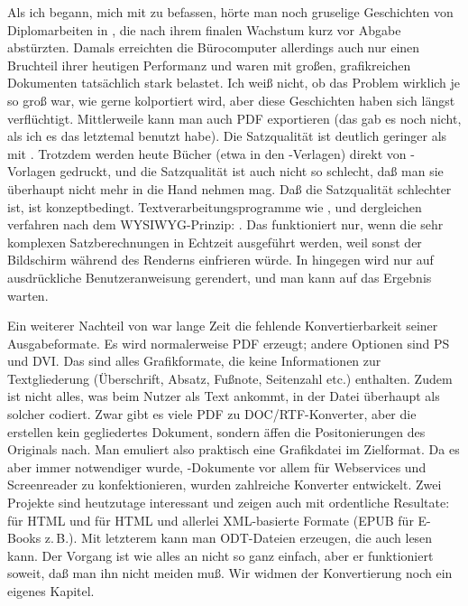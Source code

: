 \documentclass[
	11pt,        %
	table,       %
	twoside,     %
	notitlepage, %
]{scrreprt}
\begin{document}
Als ich begann, mich mit \LaTeXi{} zu befassen, hörte man noch gruselige Geschichten von Diplomarbeiten in , die nach ihrem finalen Wachstum kurz vor Abgabe abstürzten. Damals erreichten die Bürocomputer allerdings auch nur einen Bruchteil ihrer heutigen Performanz und waren mit großen, grafikreichen Dokumenten tatsächlich stark belastet. Ich weiß nicht, ob das Problem wirklich je so groß war, wie gerne kolportiert wird, aber diese Geschichten haben sich längst verflüchtigt. Mittlerweile kann man auch PDF exportieren (das gab es noch nicht, als ich es das letztemal benutzt habe). Die Satzqualität ist deutlich geringer als mit \LaTeXi. Trotzdem werden heute Bücher (etwa in den -Verlagen) direkt von -Vorlagen gedruckt, und die Satzqualität ist auch nicht so schlecht, daß man sie überhaupt nicht mehr in die Hand nehmen mag. Daß die Satzqualität schlechter ist, ist konzeptbedingt. Textverarbeitungsprogramme wie ,  und dergleichen verfahren nach dem WYSIWYG-Prinzip: . Das funktioniert nur, wenn die sehr komplexen Satzberechnungen in Echtzeit ausgeführt werden, weil sonst der Bildschirm während des Renderns einfrieren würde. In \LaTeXi{} hingegen wird nur auf ausdrückliche Benutzeranweisung gerendert, und man kann auf das Ergebnis warten.

Ein weiterer Nachteil von \LaTeXi{} war lange Zeit die fehlende Konvertierbarkeit seiner Ausgabeformate. Es wird normalerweise PDF erzeugt; andere Optionen sind PS und DVI. Das sind alles Grafikformate, die keine Informationen zur Textgliederung (Überschrift, Absatz, Fußnote, Seitenzahl etc.) enthalten. Zudem ist nicht alles, was beim Nutzer als Text ankommt, in der Datei überhaupt als solcher codiert. Zwar gibt es viele PDF zu DOC/RTF-Konverter, aber die erstellen kein gegliedertes Dokument, sondern äffen die Positonierungen des Originals nach. Man emuliert also praktisch eine Grafikdatei im Zielformat. Da es aber immer notwendiger wurde, \LaTeXi{}-Dokumente vor allem für Webservices und Screenreader zu konfektionieren, wurden zahlreiche  Konverter entwickelt. Zwei Projekte sind heutzutage interessant und zeigen auch mit \archbib{} ordentliche Resultate:
\Paket{\LaTeXML{}} für HTML und  für HTML und allerlei XML-basierte Formate (EPUB für E-Books z.\,B.). Mit letzterem kann man ODT-Dateien erzeugen, die auch  lesen kann. Der Vorgang ist wie alles an \LaTeXi{} nicht so ganz einfach, aber er funktioniert soweit, daß man ihn nicht meiden muß. Wir widmen der Konvertierung noch ein eigenes Kapitel.
\end{document}
